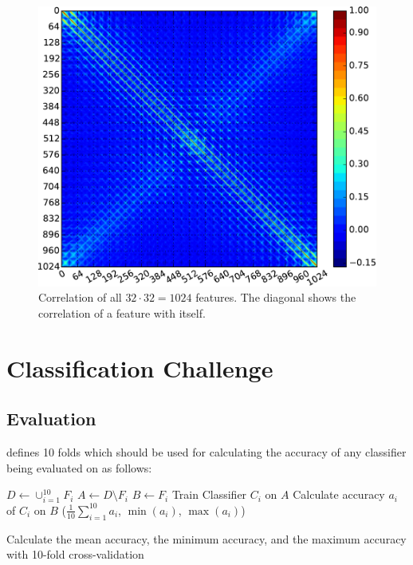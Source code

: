 \begin{figure}[h]
    \centering
    \includegraphics*[width=\linewidth, keepaspectratio]{figures/feature-correlation.pdf}
    \caption{Correlation of all $32 \cdot 32 = 1024$ features. The diagonal
             shows the correlation of a feature with itself.}
    \label{fig:feature-correlation}
\end{figure}


\section{Classification Challenge}
\subsection{Evaluation}
\dbName{} defines 10 folds which should be used for calculating the accuracy
of any classifier being evaluated on \dbName{} as follows:

\begin{algorithm}[H]
    \begin{algorithmic}
            \State $D \gets \cup_{i=1}^{10} F_i$
                \State $A \gets D \setminus F_i$
                \State $B \gets F_i$
                \State Train Classifier $C_i$ on $A$
                \State Calculate accuracy $a_i$ of $C_i$ on $B$
            \EndFor
            \State \Return ($\frac{1}{10}\sum_{i=1}^{10} a_i$, $\min(a_i)$, $\max(a_i)$)
        \EndFunction
    \end{algorithmic}
    \caption{Calculate the mean accuracy, the minimum accuracy, and the maximum
             accuracy with 10-fold cross-validation}
\label{alg:seq1}
\end{algorithm}

